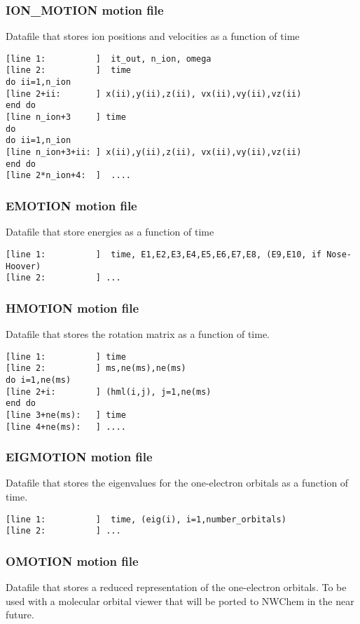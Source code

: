 \subsubsection{ION\_MOTION motion file}
Datafile that stores ion positions and velocities
as a function of time

\begin{verbatim}
[line 1:          ]  it_out, n_ion, omega
[line 2:          ]  time
do ii=1,n_ion
[line 2+ii:       ] x(ii),y(ii),z(ii), vx(ii),vy(ii),vz(ii)
end do
[line n_ion+3     ] time
do 
do ii=1,n_ion
[line n_ion+3+ii: ] x(ii),y(ii),z(ii), vx(ii),vy(ii),vz(ii)
end do
[line 2*n_ion+4:  ]  ....
\end{verbatim}

\subsubsection{EMOTION motion file}
Datafile that store energies as a function of time
\begin{verbatim}
[line 1:          ]  time, E1,E2,E3,E4,E5,E6,E7,E8, (E9,E10, if Nose-Hoover)
[line 2:          ] ...
\end{verbatim}


\subsubsection{HMOTION motion file}
Datafile that stores the rotation matrix
as a function of time.

\begin{verbatim}
[line 1:          ] time
[line 2:          ] ms,ne(ms),ne(ms)
do i=1,ne(ms)
[line 2+i:        ] (hml(i,j), j=1,ne(ms)
end do
[line 3+ne(ms):   ] time
[line 4+ne(ms):   ] ....
\end{verbatim}


\subsubsection{EIGMOTION motion file}
Datafile that stores the eigenvalues for the one-electron
orbitals as a function of time.

\begin{verbatim}
[line 1:          ]  time, (eig(i), i=1,number_orbitals)
[line 2:          ] ...
\end{verbatim}


\subsubsection{OMOTION motion file}
Datafile that stores a reduced representation of the
one-electron orbitals.  To be used with a molecular
orbital viewer that will be ported to NWChem
in the near future. 

